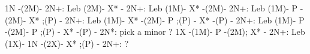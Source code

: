  1N -(2M)- 2N+: Leb
(2M)- X* - 2N+: Leb
(1M)- X* -(2M)- 2N+: Leb
(1M)- P  -(2M)- X* ;(P) - 2N+: Leb
(1M)- X* -(2M)- P  ;(P) - X* -(P) - 2N+: Leb
(1M)- P  -(2M)- P  ;(P) - X* -(P) - 2N*: pick a minor ?
 1X -(1M)- P  -(2M); X* - 2N+: Leb 
(1X)- 1N -(2X)- X* ;(P) - 2N+: ?
